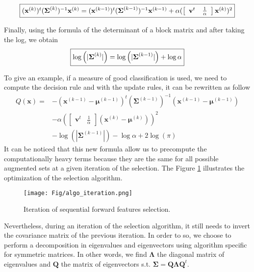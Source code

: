 \documentclass[a4paper,11pt,DIV=16]{scrartcl}
\begin{document}
        \begin{equation}
            \fbox{$(\mathbf{x}^{(k)})^t (\boldsymbol{\Sigma}^{(k)})^{-1} \mathbf{x}^{(k)} = (\mathbf{x}^{(k-1)})^t (\boldsymbol{\Sigma}^{(k-1)})^{-1} \mathbf{x}^{(k-1)} + \alpha ( \left[\begin{array}{cc} \mathbf{v}^t & \frac{1}{\alpha} \end{array}\right] \mathbf{x}^{(k)} )^2$}
        \end{equation}

        Finally, using the formula of the determinant of a block matrix and after taking the log, we obtain
        \begin{equation}
            \fbox{$\log \left(|\boldsymbol{\Sigma}^{(k)}|\right) = \log \left(|\boldsymbol{\Sigma}^{(k-1)}|\right) + \log \alpha$}
        \end{equation}

        To give an example, if a measure of good classification is used, we need to compute the decision rule and with the update rules, it can be rewritten as follow
        \begin{align*}
            Q(\mathbf{x}) = &- (\mathbf{x}^{(k-1)} - \boldsymbol{\mu}^{(k-1)})^t (\boldsymbol{\Sigma}^{(k-1)})^{-1} (\mathbf{x}^{(k-1)} - \boldsymbol{\mu}^{(k-1)}) \\
            &- \alpha ( \left[\begin{array}{cc} \mathbf{v}^t & \frac{1}{\alpha} \end{array}\right] (\mathbf{x}^{(k)} - \boldsymbol{\mu}^{(k)}) )^2 \\
            &- \log \left(|\boldsymbol{\Sigma}^{(k-1)}|\right) - \log \alpha  + 2 \log (\pi)
        \end{align*}
        It can be noticed that this new formula allow us to precompute the computationally heavy terms because they are the same for all possible augmented sets at a given iteration of the selection. The Figure \ref{fig:opt_computation} illustrates the optimization of the selection algorithm.

        \begin{figure}[!ht]
            \centering
            \setlength{\tabcolsep}{2pt}
            \texttt{[image: Fig/algo\_iteration.png]}
            \caption{Iteration of sequential forward features selection.\label{fig:opt_computation}}
        \end{figure}

        Nevertheless, during an iteration of the selection algorithm, it still needs to invert the covariance matrix of the previous iteration. In order to so, we choose to perform a decomposition in eigenvalues and eigenvectors using algorithm specific for symmetric matrices. In other words, we find $\boldsymbol{\Lambda}$ the diagonal matrix of eigenvalues and $\mathbf{Q}$ the matrix of eigenvectors s.t. $\boldsymbol{\Sigma} = \mathbf{Q} \boldsymbol{\Lambda} \mathbf{Q}^t$.
\end{document}
